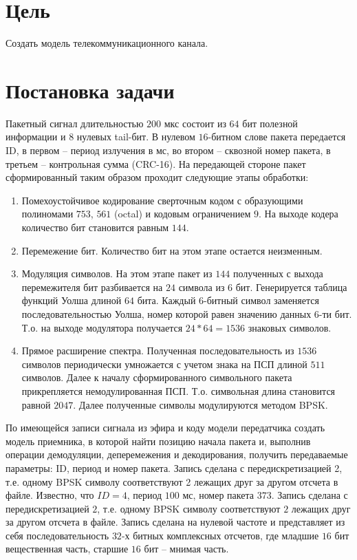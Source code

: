 \documentclass[a4paper]{article}
\begin{document}
\tableofcontents
\newpage
\section{Цель}
Создать модель телекоммуникационного канала.
\section{Постановка задачи}
Пакетный сигнал длительностью $200$ мкс состоит из $64$ бит полезной информации и $8$ нулевых tail-бит. В нулевом
$16$-битном слове пакета передается ID, в первом -- период излучения в мс, во втором -- сквозной номер пакета, в третьем
-- контрольная сумма (CRC-16). На передающей стороне пакет сформированный таким образом проходит следующие этапы обработки:
\begin{enumerate}
    \item Помехоустойчивое кодирование сверточным кодом с образующими полиномами $753$, $561$ (octal) и кодовым
          ограничением $9$. На выходе кодера количество бит становится равным $144$.
    \item Перемежение бит. Количество бит на этом этапе остается неизменным.
    \item Модуляция символов. На этом этапе пакет из $144$ полученных с выхода перемежителя бит разбивается на $24$
        символа из $6$ бит. Генерируется таблица функций Уолша длиной $64$ бита. Каждый $6$-битный символ заменяется
        последовательностью Уолша, номер которой равен значению данных $6$-ти бит. Т.о. на выходе модулятора получается
        $24*64=1536$ знаковых символов.
    \item Прямое расширение спектра. Полученная последовательность из $1536$ символов периодически умножается с учетом
        знака на ПСП длиной $511$ символов. Далее к началу сформированного символьного пакета прикрепляется
        немодулированная ПСП. Т.о. символьная длина становится равной $2047$. Далее полученные символы модулируются методом BPSK.
\end{enumerate}
По имеющейся записи сигнала из эфира и коду модели передатчика создать модель приемника, в которой найти позицию начала
пакета и, выполнив операции демодуляции, деперемежения и декодирования, получить передаваемые параметры: ID, период и
номер пакета. Запись сделана с передискретизацией 2, т.е. одному BPSK символу соответствуют 2 лежащих друг за другом
отсчета в файле.
Известно, что $ID=4$, период $100$ мс, номер пакета $373$. Запись сделана с передискретизацией $2$, т.е. одному BPSK
символу соответствуют $2$ лежащих друг за другом отсчета в файле. Запись сделана на нулевой частоте и представляет из
себя последовательность $32$-х битных комплексных отсчетов, где младшие $16$ бит вещественная часть, старшие $16$ бит
-- мнимая часть.
\end{document}
